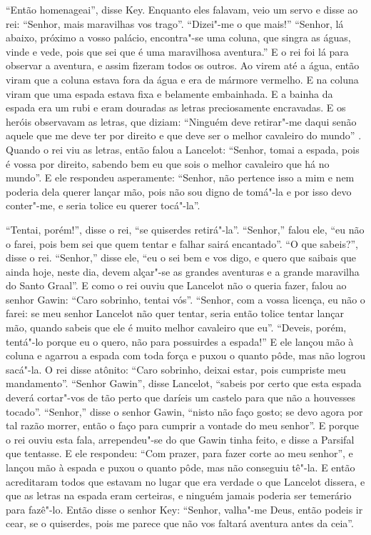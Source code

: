 “Então homenageai”, disse Key. Enquanto eles falavam, veio um servo e disse ao
rei: “Senhor, mais maravilhas vos trago”. “Dizei"-me o que mais!” “Senhor, lá
abaixo, próximo a vosso palácio, encontra"-se uma coluna, que singra as águas,
vinde e vede, pois que sei que é uma maravilhosa aventura.” E o rei foi lá para
observar a aventura, e assim fizeram todos os outros. Ao virem até a água,
então viram que a coluna estava fora da água e era de mármore vermelho. E na
coluna viram que uma espada estava fixa e belamente embainhada. E a bainha da
espada era um rubi e eram douradas as letras preciosamente encravadas. E os
heróis observavam as letras, que diziam: “Ninguém deve retirar"-me daqui senão
aquele que me deve ter por direito e que deve ser o melhor cavaleiro do mundo”
. Quando o rei viu as letras, então falou a Lancelot: “Senhor, tomai a
espada, pois é vossa por direito, sabendo bem eu que sois o melhor cavaleiro
que há no mundo”. E ele respondeu asperamente: “Senhor, não pertence isso a mim
e nem poderia dela querer lançar mão, pois não sou digno de tomá"-la e por isso
devo conter"-me, e seria tolice eu querer tocá"-la”. 

“Tentai, porém!”, disse o rei, “se quiserdes retirá"-la”. “Senhor,” falou ele,
“eu não o farei, pois bem sei que quem tentar e falhar sairá encantado”. “O que
sabeis?”, disse o rei. “Senhor,” disse ele, “eu o sei bem e vos digo, e quero
que saibais que ainda hoje, neste dia, devem alçar"-se as grandes aventuras e a
grande maravilha do Santo Graal”. E como o rei ouviu que Lancelot não
o queria fazer, falou ao senhor Gawin: “Caro sobrinho, tentai vós”. “Senhor,
com a vossa licença, eu não o farei: se meu senhor Lancelot não quer tentar,
seria então tolice tentar lançar mão, quando sabeis que ele é muito melhor
cavaleiro que eu”. “Deveis, porém, tentá"-lo porque eu o quero, não para
possuirdes a espada!” E ele lançou mão à coluna e agarrou a espada com toda
força e puxou o quanto pôde, mas não logrou sacá"-la. O rei disse atônito: “Caro
sobrinho, deixai estar, pois cumpriste meu mandamento”. “Senhor Gawin”, disse
Lancelot, “sabeis por certo que esta espada deverá cortar"-vos de tão perto que
daríeis um castelo para que não a houvesses tocado”. “Senhor,” disse o senhor
Gawin, “nisto não faço gosto; se devo agora por tal razão morrer, então o faço
para cumprir a vontade do meu senhor”. E porque o rei ouviu esta fala,
arrependeu"-se do que Gawin tinha feito, e disse a Parsifal que tentasse. E ele
respondeu: “Com prazer, para fazer corte ao meu senhor”, e lançou mão à espada
e puxou o quanto pôde, mas não conseguiu tê"-la. E então acreditaram
todos que estavam no lugar que era verdade o que Lancelot dissera, e que as
letras na espada eram certeiras, e ninguém jamais poderia ser temerário para
fazê"-lo. Então disse o senhor Key: “Senhor, valha"-me Deus, então podeis ir
cear, se o quiserdes, pois me parece que não vos faltará aventura antes da
ceia”. 

